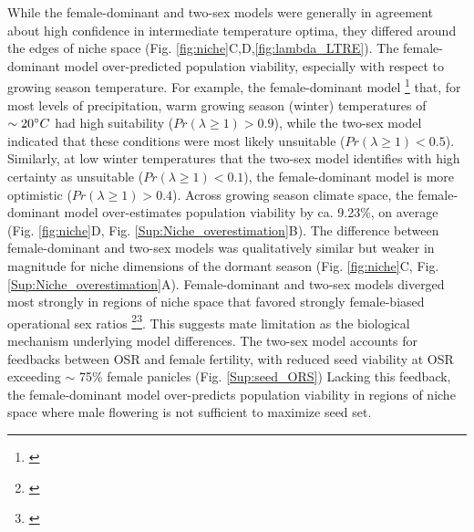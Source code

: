 \documentclass[12pt]{article}\usepackage[]{graphicx}\usepackage[dvipsnames]{xcolor}
\newcommand{\tom}[2]{{\color{red}{#1}}\footnote{\textit{\color{red}{#2}}}}
\newcommand{\jacob}[2]{{\color{blue}{#1}}\footnote{\textit{\color{blue}{#2}}}}
\begin{document}
While the female-dominant and two-sex models were generally in agreement about high confidence in intermediate temperature optima, they differed around the edges of niche space (Fig. \ref{fig:niche}C,D,\ref{fig:lambda_LTRE}). 
The female-dominant model over-predicted population viability, especially with respect to growing season temperature. 
For example, the female-dominant model \tom{predicted}{I think I am switching tenses. We will need to clean this up.} that, for most levels of precipitation, warm growing season (winter) temperatures of $\sim 20\degree C$ had high suitability ($Pr(\lambda \ge 1) > 0.9$), while the two-sex model indicated that these conditions were most likely unsuitable ($Pr(\lambda \ge 1) < 0.5$). 
Similarly, at low winter temperatures that the two-sex model identifies with high certainty as unsuitable ($Pr(\lambda \ge 1) < 0.1$), the female-dominant model is more optimistic ($Pr(\lambda \ge 1) > 0.4$). 
Across growing season climate space, the female-dominant model over-estimates population viability by ca.  9.23\%, on average (Fig. \ref{fig:niche}D, Fig. \ref{Sup:Niche_overestimation}B). 
The difference between female-dominant and two-sex models was qualitatively similar but weaker in magnitude for niche dimensions of the dormant season (Fig. \ref{fig:niche}C, Fig. \ref{Sup:Niche_overestimation}A). 
Female-dominant and two-sex models diverged most strongly in regions of niche space that favored strongly female-biased operational sex ratios \jacob{(Fig. \ref{Sup:OSR})}{The scale is correct. Let's talk about this}\tom{}{I like it! But is the scale correct on panel A?}. 
This suggests mate limitation as the biological mechanism underlying model differences. 
The two-sex model accounts for feedbacks between OSR and female fertility, with reduced seed viability at OSR exceeding $\sim$ 75\% female panicles (Fig. \ref{Sup:seed_ORS})
Lacking this feedback, the female-dominant model over-predicts population viability in regions of niche space where male flowering is not sufficient to maximize seed set. 
\end{document}
